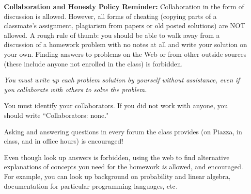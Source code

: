 \documentclass[11pt]{article}
\begin{document}



\noindent
\textbf{Collaboration and Honesty Policy Reminder:}
Collaboration in the form of discussion is allowed. However, all forms
of cheating (copying parts of a classmate’s assignment, plagiarism
from papers or old posted solutions) are NOT allowed. A rough rule of
thumb: you should be able to walk away from a discussion of a homework
problem with no notes at all and write your solution on your own.
%
Finding answers to problems on the
Web or from other outside sources (these include anyone not enrolled
in the class) is forbidden. 

\begin{compactitem}
\item {\em You must write up each problem solution by yourself without
assistance, even if you collaborate with others to solve the
problem.}

\item You must identify your collaborators. If you did not
work with anyone, you should write ``Collaborators: none."

\item Asking and answering questions in every forum the class provides (on Piazza, in class, and in
  office hours) is encouraged!

\item Even though look up answers is forbidden, using the web to find
  alternative explanations of concepts you need for the homework
  \emph{is} allowed, and encouraged. For example, you can look up
  background on probability and linear algebra, documentation for
  particular programming languages, etc.
    \end{compactitem}
\end{document}
